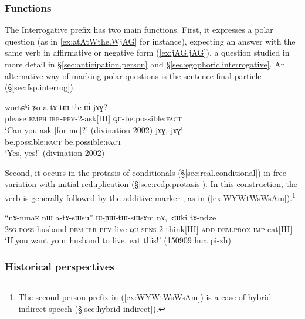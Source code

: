  \subsubsection{Functions} \label{sec:interrogative.W.function}
The Interrogative prefix  has two main functions.  First, it expresses a polar question (as in \ref{ex:atAtWthe.WjAG} for instance), expecting an answer with the same verb in affirmative or negative form (\ref{ex:jAG.jAG}), a question studied in more detail in §\ref{sec:anticipation.person} and §\ref{sec:egophoric.interrogative}. An alternative way of marking polar questions is the sentence final particle  (§\ref{sec:fsp.interrog}).


\begin{exe}
\ex 
\begin{xlist}
\ex \label{ex:atAtWthe.WjAG}
 \gll wortɕʰi ʑo a-tɤ-tɯ-tʰe ɯ́-jɤɣ? \\
please \textsc{emph} \textsc{irr}-\textsc{pfv}-2-ask[III] \textsc{qu}-be.possible:\textsc{fact} \\ 
\glt `Can you ask [for me]?' (divination 2002)
\ex \label{ex:jAG.jAG}
 \gll jɤɣ, jɤɣ! \\
be.possible:\textsc{fact} be.possible:\textsc{fact} \\ 
\glt `Yes, yes!' (divination 2002)
\end{xlist}
\end{exe}

Second, it occurs in the protasis of conditionals (§\ref{sec:real.conditional}) in free variation with initial reduplication (§\ref{sec:redp.protasis}). In this construction, the verb is generally followed by the additive marker , as in (\ref{ex:WYWtWsWsAm}).\footnote{The second person prefix  in (\ref{ex:WYWtWsWsAm}) is a case of hybrid indirect speech (§\ref{sec:hybrid indirect}). }
 
\begin{exe}
\ex \label{ex:WYWtWsWsAm}
 \gll ``nɤ-nmaʁ nɯ a-tɤ-sɯsu'' ɯ-ɲɯ́-tɯ-sɯsɤm nɤ, kɯki tɤ-ndze \\
 \textsc{2sg}.\textsc{poss}-husband \textsc{dem} \textsc{irr}-\textsc{pfv}-live \textsc{qu}-\textsc{sens}-2-think[III] \textsc{add} \textsc{dem}.\textsc{prox} \textsc{imp}-eat[III] \\
\glt `If you want your husband to live, eat this!' (150909 hua pi-zh) 
\end{exe}

\subsubsection{Historical perspectives} \label{sec:interrogative.e.history}

